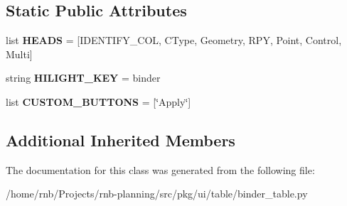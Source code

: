 \subsection*{Static Public Attributes}
\begin{DoxyCompactItemize}
\item 
\mbox{\label{classrnb-planning_1_1src_1_1pkg_1_1ui_1_1table_1_1binder__table_1_1_binder_table_a5805f69f6e9b4a142a873e929eaaf7b6}} 
list {\bfseries H\+E\+A\+DS} = \mbox{[}I\+D\+E\+N\+T\+I\+F\+Y\+\_\+\+C\+OL, \textquotesingle{}C\+Type\textquotesingle{}, \textquotesingle{}Geometry\textquotesingle{}, \textquotesingle{}R\+PY\textquotesingle{}, \textquotesingle{}Point\textquotesingle{}, \textquotesingle{}Control\textquotesingle{}, \textquotesingle{}Multi\textquotesingle{}\mbox{]}
\item 
\mbox{\label{classrnb-planning_1_1src_1_1pkg_1_1ui_1_1table_1_1binder__table_1_1_binder_table_aea4f258cd521410c84ff35c83256caba}} 
string {\bfseries H\+I\+L\+I\+G\+H\+T\+\_\+\+K\+EY} = \textquotesingle{}binder\textquotesingle{}
\item 
\mbox{\label{classrnb-planning_1_1src_1_1pkg_1_1ui_1_1table_1_1binder__table_1_1_binder_table_a4520722006654ee7c12749a4b38ec25d}} 
list {\bfseries C\+U\+S\+T\+O\+M\+\_\+\+B\+U\+T\+T\+O\+NS} = \mbox{[}\char`\"{}Apply\char`\"{}\mbox{]}
\end{DoxyCompactItemize}
\subsection*{Additional Inherited Members}


The documentation for this class was generated from the following file\+:\begin{DoxyCompactItemize}
\item 
/home/rnb/\+Projects/rnb-\/planning/src/pkg/ui/table/binder\+\_\+table.\+py\end{DoxyCompactItemize}
